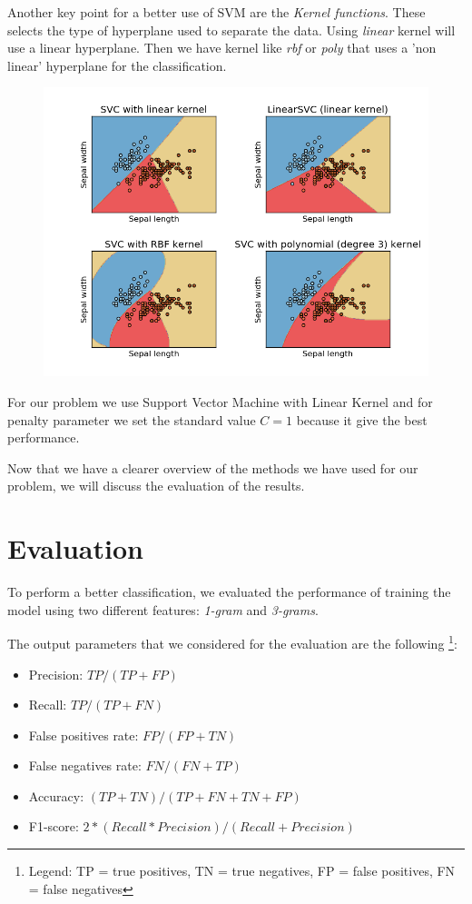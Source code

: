 \documentclass[12pt]{article}
\begin{document}
Another key point for a better use of SVM are the {\em Kernel functions}. These selects the type of hyperplane used to separate the data. Using {\em linear} kernel will use a linear hyperplane. Then we have kernel like {\em rbf} or {\em poly} that uses a 'non linear' hyperplane for the classification.
\begin{figure}[!ht]
 \includegraphics[width=1\textwidth]{pic1}
 \label{fig:Example of SVM}
\end{figure}
\newline
For our problem we use Support Vector Machine with Linear Kernel and for penalty parameter we set the standard value $C = 1$ because it give the best performance.

Now that we have a clearer overview of the methods we have used for our problem, we will discuss the evaluation of the results.

\section{Evaluation}
To perform a better classification, we evaluated the performance of training the model using two different features: {\em 1-gram} and {\em 3-grams}.

The output parameters that we considered for the evaluation are the following \footnote{Legend: TP = true positives, TN = true negatives, FP = false positives, FN = false negatives}:

\begin{itemize}
\item Precision: $TP / (TP + FP)$
\item Recall: $TP / (TP + FN)$
\item False positives rate: $FP / (FP + TN)$
\item False negatives rate: $FN / (FN + TP)$
\item Accuracy: $(TP + TN) / (TP + FN + TN + FP)$
\item F1-score: $ 2*(Recall*Precision)/(Recall+Precision)$
\end{itemize}
\end{document}
